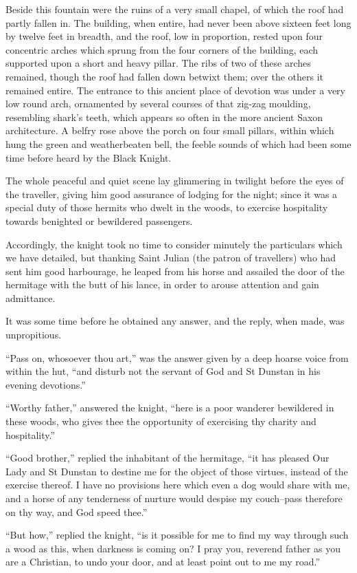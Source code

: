 Beside this fountain were the ruins of a very small chapel, of which the
roof had partly fallen in. The building, when entire, had never been
above sixteen feet long by twelve feet in breadth, and the roof, low in
proportion, rested upon four concentric arches which sprung from the
four corners of the building, each supported upon a short and heavy
pillar. The ribs of two of these arches remained, though the roof had
fallen down betwixt them; over the others it remained entire. The
entrance to this ancient place of devotion was under a very low round
arch, ornamented by several courses of that zig-zag moulding, resembling
shark's teeth, which appears so often in the more ancient Saxon
architecture. A belfry rose above the porch on four small pillars,
within which hung the green and weatherbeaten bell, the feeble sounds of
which had been some time before heard by the Black Knight.

The whole peaceful and quiet scene lay glimmering in twilight before the
eyes of the traveller, giving him good assurance of lodging for the
night; since it was a special duty of those hermits who dwelt in the
woods, to exercise hospitality towards benighted or bewildered
passengers.

Accordingly, the knight took no time to consider minutely the
particulars which we have detailed, but thanking Saint Julian (the
patron of travellers) who had sent him good harbourage, he leaped from
his horse and assailed the door of the hermitage with the butt of his
lance, in order to arouse attention and gain admittance.

It was some time before he obtained any answer, and the reply, when
made, was unpropitious.

``Pass on, whosoever thou art,'' was the answer given by a deep hoarse
voice from within the hut, ``and disturb not the servant of God and St
Dunstan in his evening devotions.''

``Worthy father,'' answered the knight, ``here is a poor wanderer
bewildered in these woods, who gives thee the opportunity of exercising
thy charity and hospitality.''

``Good brother,'' replied the inhabitant of the hermitage, ``it has
pleased Our Lady and St Dunstan to destine me for the object of those
virtues, instead of the exercise thereof. I have no provisions here
which even a dog would share with me, and a horse of any tenderness of
nurture would despise my couch--pass therefore on thy way, and God speed
thee.''

``But how,'' replied the knight, ``is it possible for me to find my way
through such a wood as this, when darkness is coming on? I pray you,
reverend father as you are a Christian, to undo your door, and at least
point out to me my road.''

